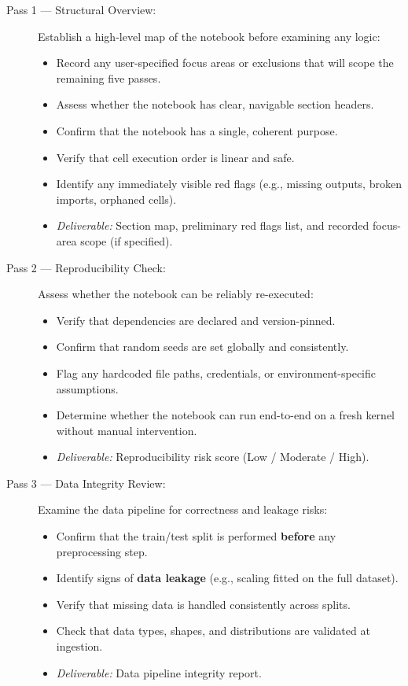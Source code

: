 \documentclass[11pt, a4paper]{article}
\begin{document}
\begin{description}
	
	\item[Pass 1 — Structural Overview:]
	Establish a high-level map of the notebook before examining any logic:
	\begin{itemize}
		\item Record any user-specified focus areas or exclusions
		that will scope the remaining five passes.
		\item Assess whether the notebook has clear, navigable
		section headers.
		\item Confirm that the notebook has a single, coherent purpose.
		\item Verify that cell execution order is linear and safe.
		\item Identify any immediately visible red flags
		(e.g., missing outputs, broken imports, orphaned cells).
		\item \textit{Deliverable:} Section map, preliminary red flags
		list, and recorded focus-area scope (if specified).
	\end{itemize}
	
	\item[Pass 2 — Reproducibility Check:]
	Assess whether the notebook can be reliably re-executed:
	\begin{itemize}
		\item Verify that dependencies are declared and version-pinned.
		\item Confirm that random seeds are set globally and consistently.
		\item Flag any hardcoded file paths, credentials, or
		environment-specific assumptions.
		\item Determine whether the notebook can run end-to-end
		on a fresh kernel without manual intervention.
		\item \textit{Deliverable:} Reproducibility risk score
		(Low / Moderate / High).
	\end{itemize}
	
	\item[Pass 3 — Data Integrity Review:]
	Examine the data pipeline for correctness and leakage risks:
	\begin{itemize}
		\item Confirm that the train/test split is performed
		\textbf{before} any preprocessing step.
		\item Identify signs of \textbf{data leakage}
		(e.g., scaling fitted on the full dataset).
		\item Verify that missing data is handled consistently
		across splits.
		\item Check that data types, shapes, and distributions
		are validated at ingestion.
		\item \textit{Deliverable:} Data pipeline integrity report.
	\end{itemize}
	

\end{description}
\end{document}
